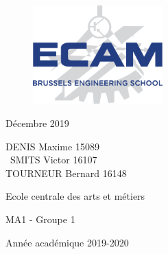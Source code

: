 	\begin{titlepage}
		\begin{center}
			\vspace*{\fill}
			
 			\begin{figure}[h]
       	 		\includegraphics[width=5cm, center]{Figures/Logo_ECAM.jpg}	
       	 	\end{figure}
 			\vspace{\baselineskip}
 			
       		\vspace{0.5cm}


       		\normalsize{Décembre 2019} 
			
       		\vspace*{\fill}
       		
       		\large{DENIS Maxime 15089 \\\
                SMITS Victor 16107\\
                TOURNEUR Bernard 16148}
            \vspace{\baselineskip}
            
            \large{Ecole centrale des arts et métiers}
            \vspace{\baselineskip}
            
       		\small{MA1 -  Groupe 1}
       		\vspace{\baselineskip}
       		
       		\normalsize{Année académique 2019-2020}
   		\end{center}
	\end{titlepage}